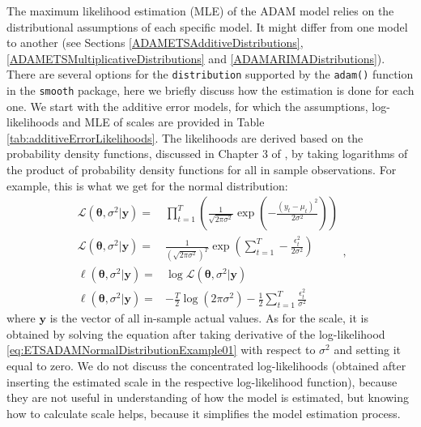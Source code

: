 \documentclass[
]{book}
\theoremstyle{definition}
\theoremstyle{definition}
\theoremstyle{definition}
\theoremstyle{definition}
\theoremstyle{remark}
\begin{document}
The maximum likelihood estimation (MLE) of the ADAM model relies on the distributional assumptions of each specific model. It might differ from one model to another (see Sections \ref{ADAMETSAdditiveDistributions}, \ref{ADAMETSMultiplicativeDistributions} and \ref{ADAMARIMADistributions}). There are several options for the \texttt{distribution} supported by the \texttt{adam()} function in the \texttt{smooth} package, here we briefly discuss how the estimation is done for each one. We start with the additive error models, for which the assumptions, log-likelihoods and MLE of scales are provided in Table \ref{tab:additiveErrorLikelihoods}. The likelihoods are derived based on the probability density functions, discussed in Chapter 3 of \citet{SvetunkovSBA}, by taking logarithms of the product of probability density functions for all in sample observations. For example, this is what we get for the normal distribution:
\begin{equation}
  \begin{aligned}
    \mathcal{L}(\boldsymbol{\theta}, {\sigma}^2 | \mathbf{y}) = & \prod_{t=1}^T \left(\frac{1}{\sqrt{2 \pi \sigma^2}} \exp \left( -\frac{\left(y_t -\mu_t \right)^2}{2 \sigma^2} \right)\right) \\
    \mathcal{L}(\boldsymbol{\theta}, {\sigma}^2 | \mathbf{y}) = & \frac{1}{\left(\sqrt{2 \pi \sigma^2}\right)^T} \exp \left( \sum_{t=1}^T -\frac{\epsilon_t^2}{2 \sigma^2} \right) \\
    \ell(\boldsymbol{\theta}, {\sigma}^2 | \mathbf{y}) = & \log \mathcal{L}(\boldsymbol{\theta}, {\sigma}^2 | \mathbf{y}) \\
    \ell(\boldsymbol{\theta}, {\sigma}^2 | \mathbf{y}) = & -\frac{T}{2} \log(2 \pi \sigma^2) -\frac{1}{2} \sum_{t=1}^T \frac{\epsilon_t^2}{\sigma^2}
  \end{aligned},
  \label{eq:ETSADAMNormalDistributionExample01}
\end{equation}
where \(\mathbf{y}\) is the vector of all in-sample actual values. As for the scale, it is obtained by solving the equation after taking derivative of the log-likelihood \eqref{eq:ETSADAMNormalDistributionExample01} with respect to \(\sigma^2\) and setting it equal to zero. We do not discuss the concentrated log-likelihoods (obtained after inserting the estimated scale in the respective log-likelihood function), because they are not useful in understanding of how the model is estimated, but knowing how to calculate scale helps, because it simplifies the model estimation process.
\end{document}

